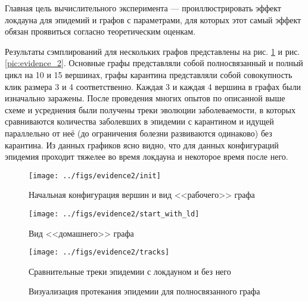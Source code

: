 	Главная цель вычислительного эксперимента --- проиллюстрировать эффект локдауна для эпидемий и графов с параметрами, для которых этот самый эффект обязан проявиться согласно теоретическим оценкам. 
	
	Результаты сэмплирований для нескольких графов представлены на рис. \ref{pic:evidence_1} и рис. \ref{pic:evidence_2}. Основные графы представляли собой полносвязанный и полный цикл на 10 и 15 вершинах, графы карантина представляли собой совокупность клик размера 3 и 4 соответственно. Каждая 3 и каждая 4 вершина в графах были изначально заражены. После проведения многих опытов по описанной выше схеме и усреднения были получены треки эволюции заболеваемости, в которых сравниваются количества заболевших в эпидемии с карантином и идущей параллельно от неё (до ограничения болезни развиваются одинаково) без карантина. Из данных графиков ясно видно, что для данных конфигураций эпидемия проходит тяжелее во время локдауна и некоторое время после него.
	
	\begin{figure}[h]
		\begin{center}
			\begin{minipage}{0.49\linewidth}
			\texttt{[image: ../figs/evidence2/init]}
			
			\centering
			Начальная конфигурация вершин и вид <<рабочего>> графа
		\end{minipage}
		\begin{minipage}{0.49\linewidth}
			\texttt{[image: ../figs/evidence2/start\_with\_ld]}
			
			\centering
			Вид <<домашнего>> графа
		\end{minipage}
		\end{center}
	
		\begin{center}
			\begin{minipage}{0.49\linewidth}
				\texttt{[image: ../figs/evidence2/tracks]}
				
				\centering
				Сравнительные треки эпидемии с локдауном и без него
			\end{minipage}
		\end{center}
	
		\caption{Визуализация протекания эпидемии для полносвязанного графа}\label{pic:evidence_1}
	\end{figure}

